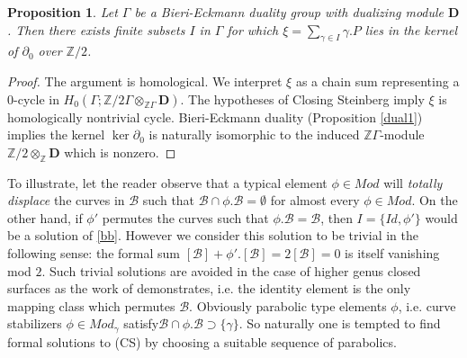 \documentclass[12pt]{amsart}
\newtheorem{prop}[thm]{Proposition}
\theoremstyle{definition}
\theoremstyle{remark}
\newcommand{\bZ}{\mathbb{Z}}
\newcommand{\del}{\partial}
\newcommand{\sB}{\mathscr{B}}
\newcommand{\bD}{\textbf{D}}
\begin{document}
\begin{prop}\label{noobs}
Let $\Gamma$ be a Bieri-Eckmann duality group with dualizing module $\bD$. Then there exists finite subsets $I$ in $\Gamma$ for which $\xi=\sum_{\gamma\in I}\gamma.P$ lies in the kernel of $\del_0$ over $\bZ/2$.
\end{prop}
\begin{proof}
The argument is homological. We interpret $\xi$ as a chain sum representing a $0$-cycle in $H_0(\Gamma; \bZ/2 \Gamma \otimes_{\bZ \Gamma} \bD)$. The hypotheses of Closing Steinberg imply $\xi$ is homologically nontrivial cycle. Bieri-Eckmann duality (Proposition \ref{dual1}) implies the kernel $\ker \del_0$ is naturally isomorphic to the induced $\bZ \Gamma$-module $\bZ /2 \otimes_\bZ \textbf{D}$ which is nonzero. 
\end{proof}

To illustrate, let the reader observe that a typical element $\phi\in Mod$ will \emph{totally displace} the curves in $\sB$ such that $\sB \cap \phi.\sB=\emptyset$ for almost every $\phi\in Mod$. On the other hand, if $\phi'$ permutes the curves such that $\phi.\sB=\sB$, then $I=\{Id,\phi'\}$ would be a solution of \eqref{bb}. However we consider this solution to be trivial in the following sense: the formal sum $[\sB]+\phi'.[\sB]=2[\sB]=0$ is itself vanishing mod $2$. Such trivial solutions are avoided in the case of higher genus closed surfaces as the work of \cite{birman2013finite} demonstrates, i.e. the identity element is the only mapping class which permutes $\sB$. Obviously parabolic type elements $\phi$, i.e. curve stabilizers $\phi\in Mod_\gamma$ satisfy$\sB \cap \phi.\sB \supset \{\gamma\}$. So naturally one is tempted to find formal solutions to (CS) by choosing a suitable sequence of parabolics. 
\end{document}

